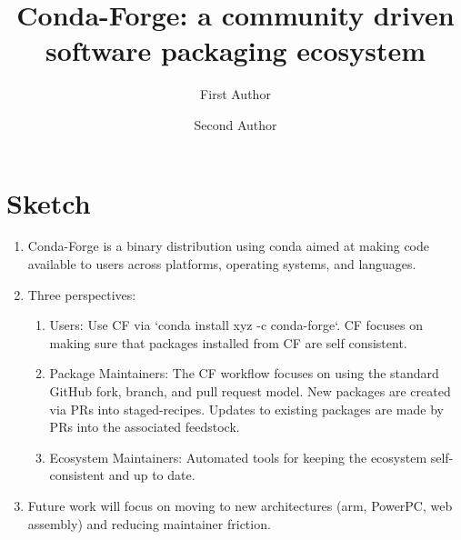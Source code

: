 \documentclass[fleqn,10pt,lineno]{wlpeerj} %
\title{Conda-Forge: a community driven software packaging ecosystem}
\author[1]{First Author}
\author[2]{Second Author}
\affil[1]{Address of first author}
\affil[2]{Address of second author}
\begin{document}
\flushbottom
\maketitle
\thispagestyle{empty}


\section*{Sketch}
\begin{enumerate}
\item Conda-Forge is a binary distribution using conda aimed at making code
available to users across platforms, operating systems, and languages.
\item Three perspectives:
\begin{enumerate}
\item Users: Use CF via `conda install xyz -c conda-forge`. CF focuses
on making sure that packages installed from CF are self consistent.
\item Package Maintainers: The CF workflow focuses on using the standard
GitHub fork, branch, and pull request model. New packages are created via
PRs into staged-recipes. Updates to existing packages are made by PRs into
the associated feedstock.
\item Ecosystem Maintainers: Automated tools for keeping the ecosystem
self-consistent and up to date.
\end{enumerate}
\item Future work will focus on moving to new architectures (arm, PowerPC,
web assembly) and reducing maintainer friction.
\end{enumerate}
\end{document}
